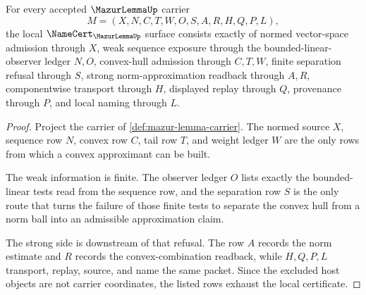 \begin{theorem}
\label{thm:mazur-lemma-namecert-obligations}
For every accepted $\MazurLemmaUp$ carrier
$$
M=(X,N,C,T,W,O,S,A,R,H,Q,P,L),
$$
the local $\NameCert_{\MazurLemmaUp}$ surface consists exactly of normed vector-space admission through $X$, weak sequence exposure through the bounded-linear-observer ledger $N,O$, convex-hull admission through $C,T,W$, finite separation refusal through $S$, strong norm-approximation readback through $A,R$, componentwise transport through $H$, displayed replay through $Q$, provenance through $P$, and local naming through $L$.
\end{theorem}
\begin{proof}
Project the carrier of \autoref{def:mazur-lemma-carrier}. The normed source $X$, sequence row $N$, convex row $C$, tail row $T$, and weight ledger $W$ are the only rows from which a convex approximant can be built.

The weak information is finite. The observer ledger $O$ lists exactly the bounded-linear tests read from the sequence row, and the separation row $S$ is the only route that turns the failure of those finite tests to separate the convex hull from a norm ball into an admissible approximation claim.

The strong side is downstream of that refusal. The row $A$ records the norm estimate and $R$ records the convex-combination readback, while $H,Q,P,L$ transport, replay, source, and name the same packet. Since the excluded host objects are not carrier coordinates, the listed rows exhaust the local certificate.
\end{proof}


